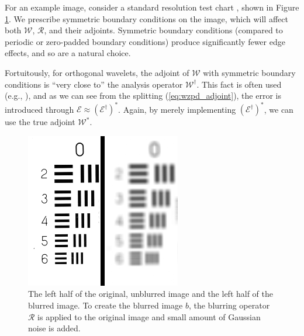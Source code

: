 \documentclass[journal]{IEEEtran}
\begin{document}
For an example image, consider a standard resolution test chart \cite{weber_1993}, shown in Figure \ref{fig:original}.  We prescribe symmetric boundary conditions on the image, which will affect both $\mathcal{W}$, $\mathcal{R}$, and their adjoints.  Symmetric boundary conditions (compared to periodic or zero-padded boundary conditions) produce significantly fewer edge effects, and so are a natural choice.

Fortuitously, for orthogonal wavelets, the adjoint of $\mathcal{W}$ with symmetric boundary conditions is ``very close to'' the analysis operator $\mathcal{W}^\dagger$.  This fact is often used (e.g., \cite{beck_2009}), and as we can see from the splitting (\ref{eq:wzpd_adjoint}), the error is introduced through $\mathcal{E} \approx \left(\mathcal{E}^\dagger\right)^\ast$.  Again, by merely implementing $\left(\mathcal{E}^\dagger\right)^\ast$, we can use the true adjoint $\mathcal{W}^\ast$.

\begin{figure}
   \centering
   \includegraphics[width=0.8\columnwidth]{figures/resolution_blurred_figure.png}
   \caption{The left half of the original, unblurred image and the left half of the blurred image.  To create the blurred image $b$, the blurring operator $\mathcal{R}$ is applied to the original image and small amount of Gaussian noise is added.}
   \label{fig:original}
\end{figure}
\end{document}
